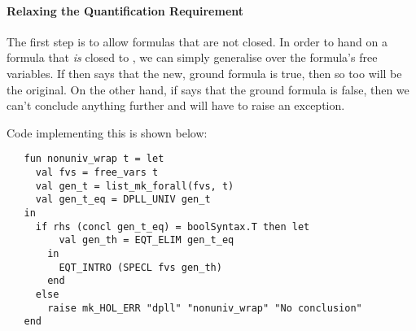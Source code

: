 \paragraph{Relaxing the Quantification Requirement}  The first step is
to allow formulas that are not closed.  In order to hand on a formula
that \emph{is} closed to , we can simply generalise
over the formula's free variables.   If  then says that
the new, ground formula is true, then so too will be the original.  On
the other hand, if  says that the ground formula is
false, then we can't conclude anything further and will have to raise
an exception.

Code implementing this is shown below:
\begin{hol}
\begin{verbatim}
   fun nonuniv_wrap t = let
     val fvs = free_vars t
     val gen_t = list_mk_forall(fvs, t)
     val gen_t_eq = DPLL_UNIV gen_t
   in
     if rhs (concl gen_t_eq) = boolSyntax.T then let
         val gen_th = EQT_ELIM gen_t_eq
       in
         EQT_INTRO (SPECL fvs gen_th)
       end
     else
       raise mk_HOL_ERR "dpll" "nonuniv_wrap" "No conclusion"
   end
\end{verbatim}
\end{hol}

